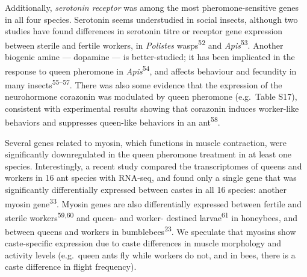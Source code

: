 \documentclass[12pt,]{article}
\begin{document}
Additionally, \emph{serotonin receptor} was among the most
pheromone-sensitive genes in all four species. Serotonin seems
understudied in social insects, although two studies have found
differences in serotonin titre or receptor gene expression between
sterile and fertile workers, in \emph{Polistes}
wasps\textsuperscript{52} and \emph{Apis}\textsuperscript{53}. Another
biogenic amine --- dopamine --- is better-studied; it has been
implicated in the response to queen pheromone in
\emph{Apis}\textsuperscript{54}, and affects behaviour and fecundity in
many insects\textsuperscript{55--57}. There was also some evidence that
the expression of the neurohormone corazonin was modulated by queen
pheromone (e.g.~Table S17), consistent with experimental results showing
that corazonin induces worker-like behaviors and suppresses queen-like
behaviors in an ant\textsuperscript{58}.

Several genes related to myosin, which functions in muscle contraction,
were significantly downregulated in the queen pheromone treatment in at
least one species. Interestingly, a recent study compared the
transcriptomes of queens and workers in 16 ant species with RNA-seq, and
found only a single gene that was significantly differentially expressed
between castes in all 16 species: another myosin
gene\textsuperscript{33}. Myosin genes are also differentially expressed
between fertile and sterile workers\textsuperscript{59,60} and queen-
and worker- destined larvae\textsuperscript{61} in honeybees, and
between queens and workers in bumblebees\textsuperscript{23}. We
speculate that myosins show caste-specific expression due to caste
differences in muscle morphology and activity levels (e.g.~queen ants
fly while workers do not, and in bees, there is a caste difference in
flight frequency).
\end{document}
